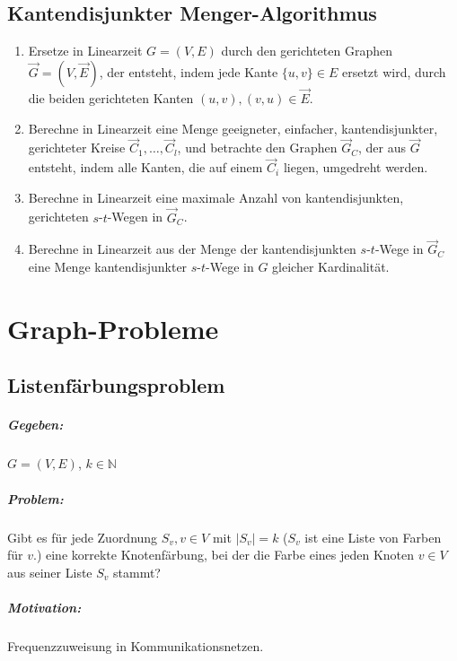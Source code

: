 \documentclass[a4paper,11pt]{report}
\begin{document}
\section{Kantendisjunkter Menger-Algorithmus}
\begin{enumerate}
    \item Ersetze in Linearzeit $G = (V, E)$ durch den gerichteten Graphen $\vec G = (V, \vec E)$, der entsteht, indem jede Kante $\{u, v\} \in E$ ersetzt wird, durch die beiden gerichteten Kanten $(u, v), (v, u) \in \vec E$.
    \item Berechne in Linearzeit eine Menge geeigneter, einfacher, kantendisjunkter, gerichteter Kreise $\vec C_1, \ldots, \vec C_l$, und betrachte den Graphen $\vec G_C$, der aus $\vec G$ entsteht, indem alle Kanten, die auf einem $\vec C_i$ liegen, umgedreht werden.
    \item Berechne in Linearzeit eine maximale Anzahl von kantendisjunkten, gerichteten $s$-$t$-Wegen in $\vec G_C$.
    \item Berechne in Linearzeit aus der Menge der kantendisjunkten $s$-$t$-Wege in $\vec G_C$ eine Menge kantendisjunkter $s$-$t$-Wege in $G$ gleicher Kardinalität.
\end{enumerate}


\chapter{Graph-Probleme}
\section{Listenfärbungsproblem}
\paragraph{Gegeben:} $G = (V, E)$, $k \in \mathbb{N}$

\paragraph{Problem:} Gibt es für jede Zuordnung $S_v, v \in V$ mit $|S_v| = k$ ($S_v$ ist eine Liste von Farben für $v$.) eine korrekte Knotenfärbung, bei der die Farbe eines jeden Knoten $v \in V$ aus seiner Liste $S_v$ stammt?

\paragraph{Motivation:} Frequenzzuweisung in Kommunikationsnetzen.
\end{document}
